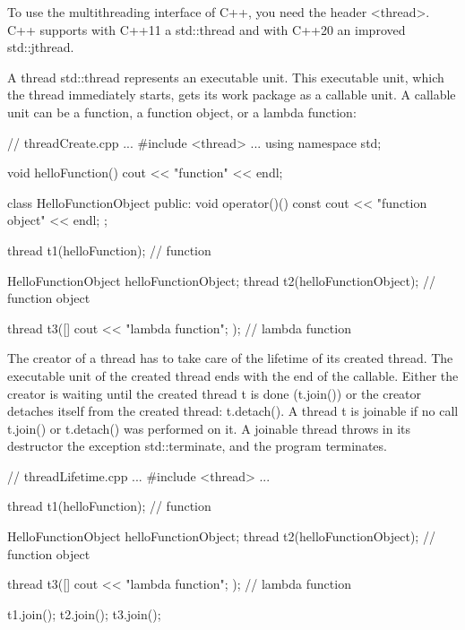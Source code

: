 
To use the multithreading interface of C++, you need the header <thread>. C++ supports with C++11 a std::thread and with C++20 an improved std::jthread.



A thread std::thread represents an executable unit. This executable unit, which the thread immediately starts, gets its work package as a callable unit. A callable unit can be a function, a function object, or a lambda function:


\begin{cpp}
// threadCreate.cpp
...
#include <thread>
...
using namespace std;

void helloFunction(){
	cout << "function" << endl;
}

class HelloFunctionObject {
public:
	void operator()() const {
		cout << "function object" << endl;
	}
};

thread t1(helloFunction); // function

HelloFunctionObject helloFunctionObject;
thread t2(helloFunctionObject); // function object

thread t3([]{ cout << "lambda function"; }); // lambda function
\end{cpp}


The creator of a thread has to take care of the lifetime of its created thread. The executable unit of the created thread ends with the end of the callable. Either the creator is waiting until the created thread t is done (t.join()) or the creator detaches itself from the created thread: t.detach(). A thread t is joinable if no call t.join() or t.detach() was performed on it. A joinable thread throws in its destructor the exception std::terminate, and the program terminates.


\begin{cpp}
// threadLifetime.cpp
...
#include <thread>
...

thread t1(helloFunction); // function

HelloFunctionObject helloFunctionObject;
thread t2(helloFunctionObject); // function object

thread t3([]{ cout << "lambda function"; }); // lambda function

t1.join();
t2.join();
t3.join();
\end{cpp}

